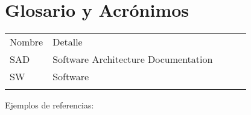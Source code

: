 \chapter{Glosario y Acrónimos}

\begin{table}[h]
\begin{tabular}{lllll}
\cline{1-2}
\multicolumn{1}{|l|}{Nombre} & \multicolumn{1}{l|}{Detalle}                              &  &  &  \\ \cline{1-2}
\multicolumn{1}{|l|}{SAD}  & \multicolumn{1}{l|}{Software Architecture Documentation} &  &  &  \\ \cline{1-2}
\multicolumn{1}{|l|}{SW}   & \multicolumn{1}{l|}{Software}                            &  &  &  \\ \cline{1-2}
                           &                                                          &  &  & 
\end{tabular}
\end{table}


Ejemplos de referencias:
\cite{AGdE-2004}   \cite{Albin-2003} \cite{AndresMejiaD-2007} \cite{Bass-Clements-Kazman-1998} \cite{BAWG-2008}
 \cite{Beck-2001} \cite{Bertalanffy-1968} \cite{Billy-Koen-2000} \cite{BIZBOK-2014} \cite{Boehm-1995}
 \cite{Booch-2007} \cite{Bredemeyer-2002} \cite{Bunge-1979} \cite{Bunge-2003} \cite{Burd-2011} \cite{Buschmann-1996}
 \cite{Capretz-1996} \cite{CCIT-1996} \cite{Claude-Perrault-1673} \cite{Clements-Northrop-1996} \cite{Cohn-2004}
 \cite{Craig-Larman-Bas-Vodde-2008} \cite{Dan-North-2009} \cite{Dan-North-2012}\cite{Donella-Meadows-1982}\cite{DRAE-2014}
\cite{DSA-2002} \cite{Edwards-Deming-2000} \cite{Esterking-2007}\cite{Evans-2004} \cite{Ferguson-2014}
\cite{Finkelstein-1996} \cite{Fiuba-2005} \cite{FOLDOC-2015} \cite{Francesco-Milizia-1781} \cite{Giraldo-2006}
\cite{PMBOK-2004} \cite{Maturana-1988} \cite{Sommerville-2006} \cite{IEEE-2000} \cite{IEEE-1993}
\cite{IEEE-1990} \cite{IEEE-Architecture} \cite{Arnau-2000} \cite{Arnau-2000} 
\cite{Kazman-1996} \cite{Beck-2003} \cite{Beck-2005}



